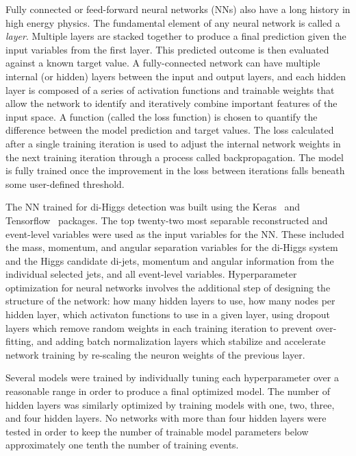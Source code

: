 \label{sec:NN}
Fully connected or feed-forward neural networks (NNs) also have a long history in high energy physics. The fundamental element of any neural network is called a \textit{layer}. Multiple layers are stacked together to produce a final prediction given the input variables from the first layer. This predicted outcome is then evaluated against a known target value. A fully-connected network can have multiple internal (or hidden) layers between the input and output layers, and each hidden layer is composed of a series of activation functions and trainable weights that allow the network to identify and iteratively combine important features of the input space. A function (called the loss function) is chosen to quantify the difference between the model prediction and target values. The loss calculated after a single training iteration is used to adjust the internal network weights in the next training iteration through a process called backpropagation. The model is fully trained once the improvement in the loss between iterations falls beneath some user-defined threshold.

The NN trained for di-Higgs detection was built using the Keras~\cite{chollet2015keras} and Tensorflow~\cite{tensorflow} packages. The top twenty-two most separable reconstructed and event-level variables were used as the input variables for the NN. These included the mass, momentum, and angular separation variables for the di-Higgs system and the Higgs candidate di-jets, momentum and angular information from the individual selected jets, and all event-level variables. Hyperparameter optimization for neural networks involves the additional step of designing the structure of the network: how many hidden layers to use, how many nodes per hidden layer, which activaton functions to use in a given layer, using dropout layers which remove random weights in each training iteration to prevent over-fitting, and adding batch normalization layers which stabilize and accelerate network training by re-scaling the neuron weights of the previous layer.

Several models were trained by individually tuning each hyperparameter over a reasonable range in order to produce a final optimized model. The number of hidden layers was similarly optimized by training models with one, two, three, and four hidden layers. No networks with more than four hidden layers were tested in order to keep the number of trainable model parameters below approximately one tenth the number of training events.

